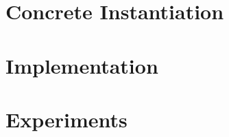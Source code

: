 \section{Concrete Instantiation}
\label{sec:ppbs-instantiation}


\section{Implementation}


\section{Experiments}
\label{sec:experiments}

